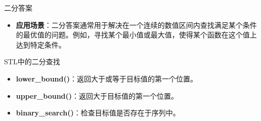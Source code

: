 \documentclass{beamer}
\begin{document}
\begin{frame}{二分答案}
    \begin{itemize}
        \item \textbf{应用场景}：二分答案通常用于解决在一个连续的数值区间内查找满足某个条件的最优值的问题。例如，寻找某个最小值或最大值，使得某个函数在这个值上达到特定条件。
    \end{itemize}
\end{frame}

\begin{frame}{STL中的二分查找}
    \begin{itemize}
        \item \textbf{lower\_bound()}：返回大于或等于目标值的第一个位置。
        \item \textbf{upper\_bound()}：返回大于目标值的第一个位置。
        \item \textbf{binary\_search()}：检查目标值是否存在于序列中。
    \end{itemize}
\end{frame}
\end{document}
